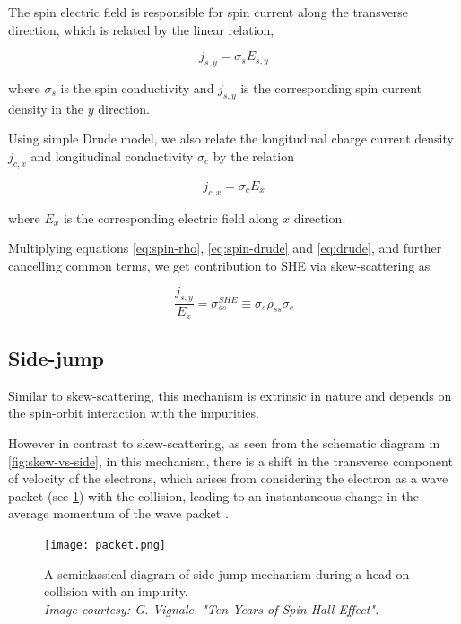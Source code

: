 The spin electric field is responsible for spin current along the transverse direction, which is related by the linear relation,

\begin{equation} \label{eq:spin-drude}
    j_{s,y} = \sigma_s E_{s,y}
\end{equation}

where \( \sigma_s \) is the spin conductivity and \( j_{s,y} \) is the corresponding spin current density in the \( y \) direction.

Using simple Drude model, we also relate the longitudinal charge current density \( j_{c,x} \) and longitudinal conductivity \( \sigma_c \) by the relation

\begin{equation} \label{eq:drude}
    j_{c,x} = \sigma_c E_x
\end{equation}

where \( E_x \) is the corresponding electric field along \( x \) direction.

Multiplying equations \ref{eq:spin-rho}, \ref{eq:spin-drude} and \ref{eq:drude}, and further cancelling common terms, we get contribution to SHE via skew-scattering as

\begin{equation} \label{eq:skew-conductivity}
    \boxed{\frac{j_{s,y}}{E_x} = \sigma_{ss}^{SHE} \equiv \sigma_s \rho_{ss} \sigma_c}
\end{equation}


\subsection*{Side-jump}

Similar to skew-scattering, this mechanism is extrinsic in nature and depends on the spin-orbit interaction with the impurities.

However in contrast to skew-scattering, as seen from the schematic diagram in \cref{fig:skew-vs-side}, in this mechanism, there is a shift in the transverse component of velocity of the electrons, which arises from considering the electron as a wave packet (see \cref{fig:side}) with the collision, leading to an instantaneous change in the average momentum of the wave packet \cite{berger1970side}.

\begin{figure}[h!]
    \centering
    \texttt{[image: packet.png]}
    \caption{A semiclassical diagram of side-jump mechanism during a head-on collision with an impurity.\\ \vspace{0.2cm} \emph{Image courtesy: G. Vignale. "Ten Years of Spin Hall Effect".}}
    \label{fig:side}
\end{figure}

